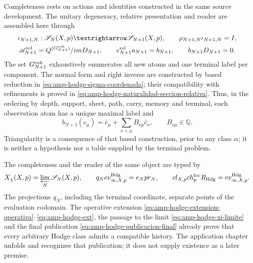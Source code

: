 Completeness rests on actions and identities constructed in the same source development. The unitary degeneracy, relative presentation and reader are assembled here through
\begin{equation}\label{eq:pdf2-g-coh-datos-operativos}
\begin{gathered}
 \iota_{N+1,N}:\mathscr S_N(X,p)\longrightarrow\mathscr S_{N+1}(X,p),
 \qquad \rho_{N+1,N}\iota_{N+1,N}=I,\\
 \mathscr A_{N+1}^{\rm rel}
  =\mathbb Q^{(\mathcal G_{N+1}^{\rm coh})}/\operatorname{im}D_{N+1},
 \qquad e_{N+1}^{\rm rel}a_{N+1}=b_{N+1},
 \qquad b_{N+1}D_{N+1}=0.
\end{gathered}
\end{equation}
The set $\mathcal G_{N+1}^{\rm coh}$ exhaustively enumerates all new atoms and one terminal label per component. The normal form and right inverse are constructed by based reduction in \eqref{eq:amp-hodge-sigma-coordenada}; their compatibility with refinements is proved in \eqref{eq:amp-hodge-naturalidad-seccion-relativa}. Thus, in the ordering by depth, support, sheet, path, carry, memory and terminal, each observation atom has a unique maximal label and
\begin{equation}\label{eq:pdf2-g-coh-tabla-dato}
 b_{N+1}(c_\mu)=\bar c_\mu+
   \sum_{\nu<\mu}B_{\nu\mu}\bar c_\nu,
 \qquad B_{\nu\mu}\in\mathbb Q.
\end{equation}
Triangularity is a consequence of that based construction, prior to any class $\alpha$; it is neither a hypothesis nor a table supplied by the terminal problem.

The completeness and the reader of the same object are typed by
\begin{equation}\label{eq:pdf2-g-coh-limite-lector-dato}
 X_\chi(X,p)=\varprojlim_N\mathscr S_N(X,p),
 \qquad
 q_N\operatorname{ev}^{\rm Hdg}_{\infty,X,p}
  =e_N\operatorname{pr}_N,
 \qquad
 \operatorname{cl}_{X,p}\operatorname{ch}^{\rm loc}_pR_{\rm Hdg}
  =\operatorname{ev}^{\rm Hdg}_{\infty,X,p}.
\end{equation}
The projections $q_N$, including the terminal coordinate, separate points of the evaluation codomain. The operative extension \eqref{eq:amp-hodge-extension-operativa}--\eqref{eq:amp-hodge-ext}, the passage to the limit \eqref{eq:amp-hodge-xi-limite} and the final publication \eqref{eq:amp-hodge-publicacion-final} already prove that every arbitrary Hodge class admits a compatible history. The application chapter unfolds and recognizes that publication; it does not supply existence as a later premise.

